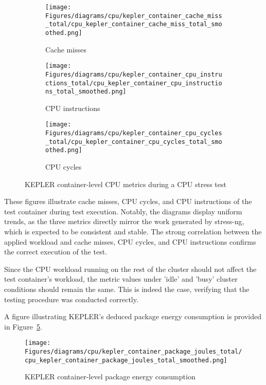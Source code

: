 \begin{figure}[H]
    \centering
    \begin{subfigure}{0.49\textwidth}
        \texttt{[image: Figures/diagrams/cpu/kepler\_container\_cache\_miss\_total/cpu\_kepler\_container\_cache\_miss\_total\_smoothed.png]}
        \caption{Cache misses}
        \label{fig:cpu_kepler_container_cache_miss_total}
    \end{subfigure}
    \begin{subfigure}{0.49\textwidth}
        \texttt{[image: Figures/diagrams/cpu/kepler\_container\_cpu\_instructions\_total/cpu\_kepler\_container\_cpu\_instructions\_total\_smoothed.png]}
        \caption{CPU instructions}
        \label{fig:cpu_kepler_container_cpu_instructions_total}
    \end{subfigure}
    \begin{subfigure}{1\textwidth}
        \texttt{[image: Figures/diagrams/cpu/kepler\_container\_cpu\_cycles\_total/cpu\_kepler\_container\_cpu\_cycles\_total\_smoothed.png]}
        \caption{CPU cycles}
        \label{fig:cpu_kepler_container_cpu_cycles_total}
    \end{subfigure}
    \caption[Container-Level CPU Metrics]{KEPLER container-level CPU metrics during a CPU stress test}
\end{figure}

These figures illustrate cache misses, CPU cycles, and CPU instructions of the test container during test execution. Notably, the diagrams display uniform trends, as the three metrics directly mirror the work generated by stress-ng, which is expected to be consistent and stable. The strong correlation between the applied workload and cache misses, CPU cycles, and CPU instructions confirms the correct execution of the test.

Since the CPU workload running on the rest of the cluster should not affect the test container’s workload, the metric values under 'idle' and 'busy' cluster conditions should remain the same. This is indeed the case, verifying that the testing procedure was conducted correctly.

A figure illustrating KEPLER's deduced package energy consumption is provided in Figure~\ref{fig:cpu_kepler_container_package_joules_total}.

\begin{figure}[H]
    \centering
    \texttt{[image: Figures/diagrams/cpu/kepler\_container\_package\_joules\_total/cpu\_kepler\_container\_package\_joules\_total\_smoothed.png]}
    \caption[Container Package Energy]{KEPLER container-level package energy consumption}
    \label{fig:cpu_kepler_container_package_joules_total}
    \end{figure}
    
